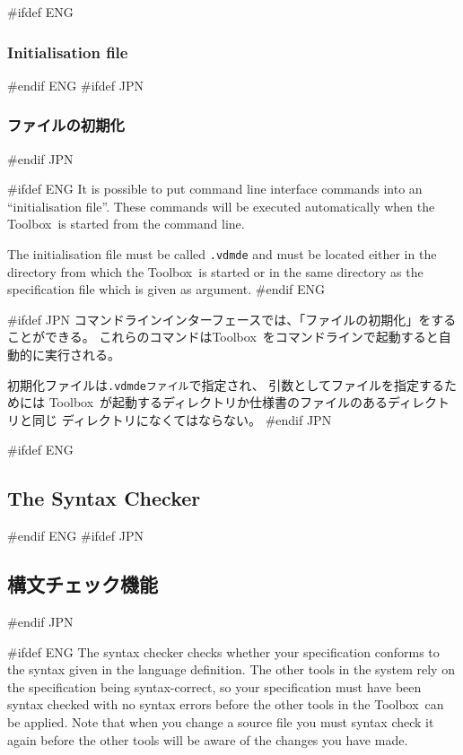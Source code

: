 \documentclass[\pformat,12pt]{article}
\newcommand{\Toolbox}{Toolbox}
\newcommand{\vdmde}{vdmde}
\newcommand{\Toolbox}{Toolbox}
\newcommand{\vdmde}{vppde}
\begin{document}
#ifdef ENG
\subsubsection{Initialisation file} 
#endif ENG
#ifdef JPN
\subsubsection{ファイルの初期化}
#endif JPN

#ifdef ENG
It is possible to put command line interface commands into an
``initialisation file''. These commands will be executed automatically 
when the \Toolbox\ is started from the command line.

The initialisation file must be called {\tt .\vdmde}\index{.\vdmde\ file} 
and must be located either in the directory from which the
\Toolbox\ is started or in the same directory as the specification
file which is given as argument.
#endif ENG

#ifdef JPN
コマンドラインインターフェースでは、「ファイルの初期化」をすることができる。
これらのコマンドは\Toolbox\ をコマンドラインで起動すると自動的に実行される。

初期化ファイルは{\tt .\vdmde ファイル}\index{.\vdmde ファイル}で指定され、
引数としてファイルを指定するためには
\Toolbox\ が起動するディレクトリか仕様書のファイルのあるディレクトリと同じ
ディレクトリになくてはならない。
#endif JPN

\newpage
#ifdef ENG
\subsection{The Syntax Checker}\label{sec:parser}
#endif ENG
#ifdef JPN
\subsection{構文チェック機能}\label{sec:parser}
#endif JPN

#ifdef ENG
The syntax checker checks whether your specification conforms to the
syntax given in the language definition. The other tools in the system
rely on the specification being syntax-correct, so your
specification must have been syntax checked with no syntax errors
before the other tools in the \Toolbox\ can be applied. Note that when you
change a source file you must syntax check it again before the other
tools will be aware of the changes you have made.
\end{document}
